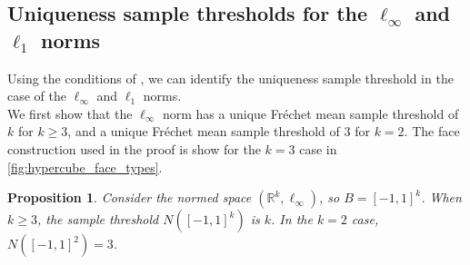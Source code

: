 \documentclass[10pt]{article}
\newtheorem{proposition}[theorem]{Proposition}
\theoremstyle{definition}
\theoremstyle{remark}
\newcommand{\R}{\mathbb{R}}
\begin{document}
	\subsection{Uniqueness sample thresholds for the $\ell_{\infty}$ and $\ell_1$ norms} \label{subsec:UST_examples}
	
	Using the conditions of , we can identify the uniqueness sample threshold in the case of the $\ell_{\infty}$ and $\ell_1$ norms.  \\
	
	We first show that the $\ell_\infty$ norm has a unique Fr\'echet mean sample threshold of $k$ for $k\geq 3$, and a unique Fr\'echet mean sample threshold of $3$ for $k= 2$. The face construction used in the proof is show for the $k=3$ case in \cref{fig:hypercube_face_types}.
	
	\begin{proposition}\label{prop:hypercube}
		Consider the normed space $(\R^k, \ell_{\infty})$, so $B=[-1,1]^k$. When $k \geq 3$, the sample threshold $N([-1,1]^k)$ is $k$. In the $k = 2$ case, $N([-1,1]^2) = 3$.
	\end{proposition}
	
\end{document}
